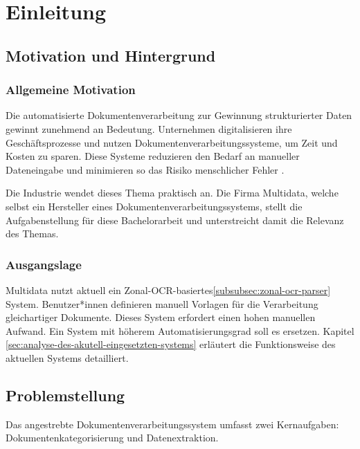 \chapter{Einleitung}
\label{cha:einleitung}

\section{Motivation und Hintergrund}
\label{sec:motivation-und-hintergrund}

\subsection{Allgemeine Motivation}
\label{subsec:allgemeine-motivation}

Die automatisierte Dokumentenverarbeitung zur Gewinnung strukturierter Daten gewinnt zunehmend an Bedeutung. Unternehmen digitalisieren ihre Geschäftsprozesse und nutzen Dokumentenverarbeitungssysteme, um Zeit und Kosten zu sparen. Diese Systeme reduzieren den Bedarf an manueller Dateneingabe und minimieren so das Risiko menschlicher Fehler \cite{PerotVincent2024LLMD}.

Die Industrie wendet dieses Thema praktisch an. Die Firma Multidata, welche selbst ein Hersteller eines Dokumentenverarbeitungssystems, stellt die Aufgabenstellung für diese Bachelorarbeit und unterstreicht damit die Relevanz des Themas.

\subsection{Ausgangslage}
\label{subsec:ausgangslage}

Multidata nutzt aktuell ein Zonal-\gls{OCR}-basiertes\ref{subsubsec:zonal-ocr-parser} System. Benutzer*innen definieren manuell Vorlagen für die Verarbeitung gleichartiger Dokumente. Dieses System erfordert einen hohen manuellen Aufwand. Ein System mit höherem Automatisierungsgrad soll es ersetzen. Kapitel \ref{sec:analyse-des-akutell-eingesetzten-systems} erläutert die Funktionsweise des aktuellen Systems detailliert.

\section{Problemstellung}
\label{sec:problemstellung}

Das angestrebte Dokumentenverarbeitungssystem umfasst zwei Kernaufgaben: Dokumentenkategorisierung und Datenextraktion.

